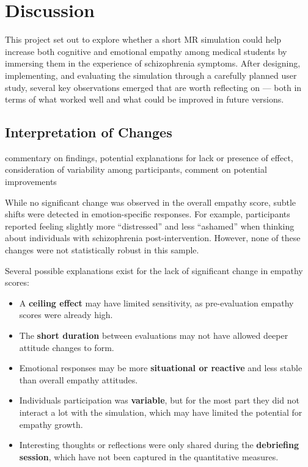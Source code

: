 \chapter{Discussion}
\label{ch:discussion}

This project set out to explore whether a short MR simulation could help increase both cognitive and emotional empathy among medical students by immersing them in the experience of schizophrenia symptoms. After designing, implementing, and evaluating the simulation through a carefully planned user study, several key observations emerged that are worth reflecting on — both in terms of what worked well and what could be improved in future versions.

\section{Interpretation of Changes}

commentary on findings, potential explanations for lack or presence of effect, consideration of variability among participants, comment on potential improvements


While no significant change was observed in the overall empathy score, subtle shifts were detected in emotion-specific responses. For example, participants reported feeling slightly more “distressed” and less “ashamed” when thinking about individuals with schizophrenia post-intervention. However, none of these changes were not statistically robust in this sample.

Several possible explanations exist for the lack of significant change in empathy scores:
\begin{itemize}
  \item A \textbf{ceiling effect} may have limited sensitivity, as pre-evaluation empathy scores were already high.
  \item The \textbf{short duration} between evaluations may not have allowed deeper attitude changes to form.
  \item Emotional responses may be more \textbf{situational or reactive} and less stable than overall empathy attitudes.
  \item Individuals participation was \textbf{variable}, but for the most part they did not interact a lot with the simulation, which may have limited the potential for empathy growth.
  \item Interesting thoughts or reflections were only shared during the \textbf{debriefing session}, which have not been captured in the quantitative measures.
\end{itemize}

